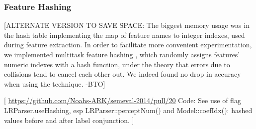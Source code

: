 \documentclass[11pt]{article}
\newcommand{\bocomment}[1]{\textcolor{Bittersweet}{[#1 -BTO]}}
\newcommand{\codenote}[1]{\textcolor{PineGreen}{[#1]}}
\begin{document}
\subsubsection{Feature Hashing}

\bocomment{ALTERNATE VERSION TO SAVE SPACE:
  The biggest memory usage was in the hash table implementing the map of feature names to integer indexes, used during feature extraction.  In order to facilitate more convenient experimentation, we implemented multitask feature hashing \cite{weinberger_feature_2009}, which randomly assigns features' numeric indexes with a hash function, under the theory that errors due to collisions tend to cancel each other out.  We indeed found no drop in accuracy when using the technique.}


\codenote{
\url{https://github.com/Noahs-ARK/semeval-2014/pull/20}
Code:
  See use of flag LRParser.useHashing, esp LRParser::perceptNum() 
  and Model::coefIdx(): hashed values before and after label conjunction.
}
\end{document}
